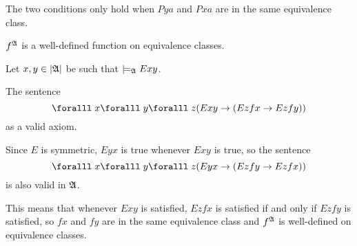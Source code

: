 \begin{Answer}
\begin{enumalph}
      \step
      The two conditions only hold when $P ya$ and $P xa$
      are in the same equivalence class.

    \item $f^{\mathfrak{A}}$ is a well-defined function on equivalence classes.
      
      \step
      Let $x, y \in \lvert\mathfrak{A}\rvert$ be such that $\models_{\mathfrak{A}} Exy$.

      \step
      The sentence
      \[ \forall x \forall y \forall z (Exy \lto (Ez fx \lto Ez fy)) \]
      as a valid axiom.

      \step
      Since $E$ is symmetric, $Eyx$ is true whenever $Exy$ is true,
      so the sentence
      \[ \forall x \forall y \forall z (Eyx \lto (Ez fy \lto Ez fx)) \]
      is also valid in $\mathfrak{A}$.

      \step
      This means that whenever $E x y$ is satisfied,
      $E z fx$ is satisfied if and only if $E z fy$ is satisfied,
      so $fx$ and $fy$ are in the same equivalence class
      and $f^{\mathfrak{A}}$ is well-defined on equivalence classes.
      
  \end{enumalph}
\end{Answer}
